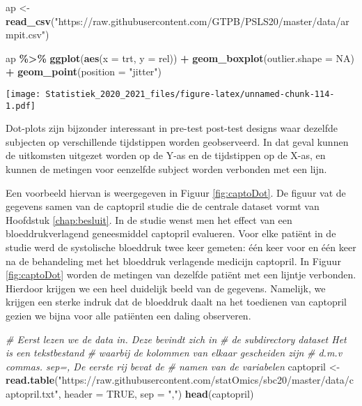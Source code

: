 \documentclass[
  12pt,dutch,coursenotes]{book}
\newenvironment{Shaded}{\begin{snugshade}}{\end{snugshade}}
\newcommand{\CommentTok}[1]{\textcolor[rgb]{0.56,0.35,0.01}{\textit{#1}}}
\newcommand{\DataTypeTok}[1]{\textcolor[rgb]{0.13,0.29,0.53}{#1}}
\newcommand{\KeywordTok}[1]{\textcolor[rgb]{0.13,0.29,0.53}{\textbf{#1}}}
\newcommand{\NormalTok}[1]{#1}
\newcommand{\OperatorTok}[1]{\textcolor[rgb]{0.81,0.36,0.00}{\textbf{#1}}}
\newcommand{\OtherTok}[1]{\textcolor[rgb]{0.56,0.35,0.01}{#1}}
\newcommand{\StringTok}[1]{\textcolor[rgb]{0.31,0.60,0.02}{#1}}
\theoremstyle{definition}
\theoremstyle{definition}
\theoremstyle{definition}
\theoremstyle{remark}
\begin{document}
\begin{Shaded}
\begin{Highlighting}[]
\NormalTok{ap \textless{}{-}}\StringTok{ }\KeywordTok{read\_csv}\NormalTok{(}\StringTok{"https://raw.githubusercontent.com/GTPB/PSLS20/master/data/armpit.csv"}\NormalTok{)}

\NormalTok{ap }\OperatorTok{\%\textgreater{}\%}\StringTok{ }\KeywordTok{ggplot}\NormalTok{(}\KeywordTok{aes}\NormalTok{(}\DataTypeTok{x =}\NormalTok{ trt, }\DataTypeTok{y =}\NormalTok{ rel)) }\OperatorTok{+}\StringTok{ }\KeywordTok{geom\_boxplot}\NormalTok{(}\DataTypeTok{outlier.shape =} \OtherTok{NA}\NormalTok{) }\OperatorTok{+}\StringTok{ }
\StringTok{    }\KeywordTok{geom\_point}\NormalTok{(}\DataTypeTok{position =} \StringTok{"jitter"}\NormalTok{)}
\end{Highlighting}
\end{Shaded}

\texttt{[image: Statistiek\_2020\_2021\_files/figure-latex/unnamed-chunk-114-1.pdf]}

Dot-plots zijn bijzonder interessant in pre-test post-test designs waar dezelfde subjecten op
verschillende tijdstippen worden geobserveerd. In dat geval kunnen de uitkomsten
uitgezet worden op de Y-as en de tijdstippen op de X-as, en kunnen de
metingen voor eenzelfde subject worden verbonden met een lijn.

Een
voorbeeld hiervan is weergegeven in Figuur \ref{fig:captoDot}. De figuur vat de gegevens samen van de captopril studie die de centrale dataset vormt van Hoofdstuk \ref{chap:besluit}. In de studie wenst men het effect van een bloeddrukverlagend geneesmiddel captopril evalueren. Voor elke patiënt in de studie werd de systolische bloeddruk twee keer gemeten: één keer voor en één keer na de behandeling met het bloeddruk verlagende medicijn captopril. In Figuur \ref{fig:captoDot} worden de metingen van dezelfde patiënt met een lijntje verbonden. Hierdoor krijgen we een heel duidelijk beeld van de gegevens. Namelijk, we krijgen een sterke indruk dat de bloeddruk daalt na het toedienen van captopril gezien we bijna voor alle patiënten een daling observeren.

\begin{Shaded}
\begin{Highlighting}[]
\CommentTok{\# Eerst lezen we de data in. Deze bevindt zich in}
\CommentTok{\# de subdirectory dataset Het is een tekstbestand}
\CommentTok{\# waarbij de kolommen van elkaar gescheiden zijn}
\CommentTok{\# d.m.v comma\textquotesingle{}s. sep=\textquotesingle{},\textquotesingle{} De eerste rij bevat de}
\CommentTok{\# namen van de variabelen}
\NormalTok{captopril \textless{}{-}}\StringTok{ }\KeywordTok{read.table}\NormalTok{(}\StringTok{"https://raw.githubusercontent.com/statOmics/sbc20/master/data/captopril.txt"}\NormalTok{, }
    \DataTypeTok{header =} \OtherTok{TRUE}\NormalTok{, }\DataTypeTok{sep =} \StringTok{","}\NormalTok{)}
\KeywordTok{head}\NormalTok{(captopril)}
\end{Highlighting}
\end{Shaded}
\end{document}
